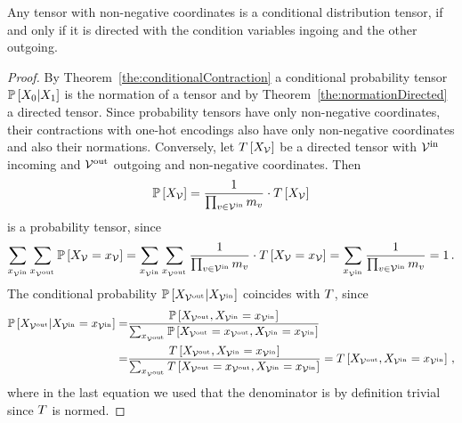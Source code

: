 \begin{theorem}\label{the:conditionalDirected}
	Any tensor with non-negative coordinates is a conditional distribution tensor, if and only if it is directed with the condition variables ingoing and the other outgoing.
\end{theorem}
\begin{proof}
	By Theorem~\ref{the:conditionalContraction} a conditional probability tensor $\mathbb{P}\left[X_{0}|X_{1}\right]$ is the normation of a tensor and by Theorem~\ref{the:normationDirected} a directed tensor.
	Since probability tensors have only non-negative coordinates, their contractions with one-hot encodings also have only non-negative coordinates and also their normations.
	Conversely, let $T\left[X_{\mathcal{V}}\right]$ be a directed tensor with $\mathcal{V}^{\mathrm{in}}$ incoming and $\mathcal{V}^{\mathrm{out}}$ outgoing and non-negative coordinates.
	Then
	\begin{align}
		\mathbb{P}\left[X_{\mathcal{V}}\right] = \frac{1}{\prod_{v\in\mathcal{V}^{\mathrm{in}}}m_{v}} \cdot T\left[X_{\mathcal{V}}\right]
	\end{align}
	is a probability tensor, since 
	\begin{align*}
		\sum_{x_{\mathcal{V}^{\mathrm{in}}}} \sum_{x_{\mathcal{V}^{\mathrm{out}}}} \mathbb{P}\left[X_{\mathcal{V}}=x_{\mathcal{V}}\right] =
		\sum_{x_{\mathcal{V}^{\mathrm{in}}}} \sum_{x_{\mathcal{V}^{\mathrm{out}}}} \frac{1}{\prod_{v\in\mathcal{V}^{\mathrm{in}}}m_{v}} \cdot T\left[X_{\mathcal{V}}=x_{\mathcal{V}}\right] =
		\sum_{x_{\mathcal{V}^{\mathrm{in}}}} \frac{1}{\prod_{v\in\mathcal{V}^{\mathrm{in}}}m_{v}} = 1 \, . 
	\end{align*}
	The conditional probability $\mathbb{P}\left[X_{\mathcal{V}^{\mathrm{out}}}|X_{\mathcal{V}^{\mathrm{in}}}\right]$ coincides with $T$, since
	\begin{align*}
		\mathbb{P}\left[X_{\mathcal{V}^{\mathrm{out}}}|X_{\mathcal{V}^{\mathrm{in}}}=x_{\mathcal{V}^{\mathrm{in}}}\right] 
		=& \frac{
		\mathbb{P}\left[X_{\mathcal{V}^{\mathrm{out}}},X_{\mathcal{V}^{\mathrm{in}}}=x_{\mathcal{V}^{\mathrm{in}}}\right]
		}{
		\sum_{x_{\mathcal{V}^{\mathrm{out}}}} \mathbb{P}\left[X_{\mathcal{V}^{\mathrm{out}}}=x_{\mathcal{V}^{\mathrm{out}}},X_{\mathcal{V}^{\mathrm{in}}}=x_{\mathcal{V}^{\mathrm{in}}}\right]
		} \\
		=& \frac{
		T\left[X_{\mathcal{V}^{\mathrm{out}}},X_{\mathcal{V}^{\mathrm{in}}}=x_{\mathcal{V}^{\mathrm{in}}}\right]
		}{
		\sum_{x_{\mathcal{V}^{\mathrm{out}}}} T\left[X_{\mathcal{V}^{\mathrm{out}}}=x_{\mathcal{V}^{\mathrm{out}}},X_{\mathcal{V}^{\mathrm{in}}}=x_{\mathcal{V}^{\mathrm{in}}}\right]
		} 
		= T\left[X_{\mathcal{V}^{\mathrm{out}}},X_{\mathcal{V}^{\mathrm{in}}}=x_{\mathcal{V}^{\mathrm{in}}}\right] \, ,
	\end{align*}
	where in the last equation we used that the denominator is by definition trivial since $T$ is normed.
\end{proof}


